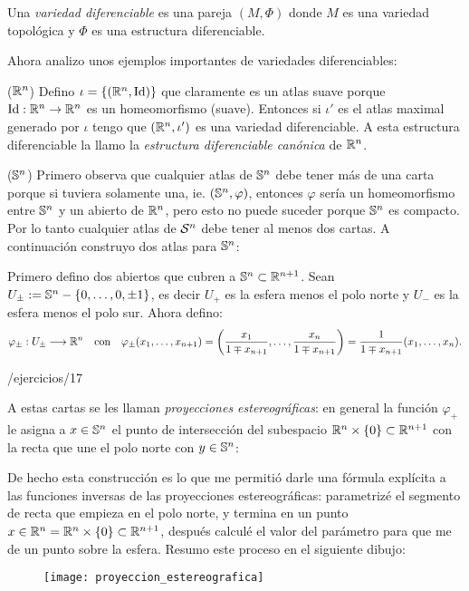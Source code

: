 \documentclass[../../topologia_algebraica]{subfiles}
\begin{document}
\begin{defin}
  Una \emph{variedad diferenciable} es una pareja $(M,\Phi)$ donde $M$ es una variedad topol\'ogica
  y $\Phi$ es una estructura diferenciable.
\end{defin}

Ahora analizo unos ejemplos importantes de variedades diferenciables:
\begin{ejemplo}\label{ejemplo:estructura_diferenciable_canonica_Rn}
  ($\mathbb{R}^n$) Defino $\iota=\{(\mathbb{R}^n,\text{Id})\}$ que claramente es un atlas suave porque $\text{Id}:\mathbb{R}^n\rightarrow\mathbb{R}^n$
  es un homeomorfismo (suave). Entonces si $\iota'$ es el atlas maximal generado por $\iota$ tengo que
  $(\mathbb{R}^n,\iota')$ es una variedad diferenciable. A esta estructura diferenciable la llamo la
  \emph{estructura diferenciable can\'onica} de $\mathbb{R}^n$.
\end{ejemplo}

\begin{ejemplo}
  ($\mathbb{S}^n$) Primero observa que cualquier atlas de $\mathbb{S}^n$ debe tener m\'as de una carta porque si
  tuviera solamente una, ie. $(\mathbb{S}^n,\varphi)$, entonces $\varphi$ ser\'ia un homeomorfismo entre
  $\mathbb{S}^n$ y un abierto de $\mathbb{R}^n$, pero esto no puede suceder porque $\mathbb{S}^n$ es compacto. Por lo
  tanto cualquier atlas de $\mathcal{S}^n$ debe tener al menos dos cartas. A continuaci\'on construyo dos
  atlas para $\mathbb{S}^n$:

  Primero defino dos abiertos que cubren a $\mathbb{S}^n\subset\mathbb{R}^{n+1}$. Sean
  $U_{\pm}:=\mathbb{S}^n-\{0,\ldots,0,\pm 1\}$, es decir $U_+$ es la esfera menos el polo norte y $U_-$ es la
  esfera menos el polo sur. Ahora defino:
  \[
    \varphi_{\pm}:U_{\pm}\longrightarrow \mathbb{R}^n \quad\text{con}\quad
    \varphi_{\pm}(x_1,\ldots,x_{n+1})=\left( \frac{x_1}{1\mp x_{n+1}},\ldots,\frac{x_n}{1\mp x_{n+1}} \right)=
    \frac{1}{1\mp x_{n+1}}(x_1,\ldots,x_n).
  \]

  {/ejercicios/17}%
  
  A  estas cartas se les llaman \emph{proyecciones estereogr\'aficas}: en general la funci\'on
  $\varphi_+$ le asigna a $x\in\mathbb{S}^n$ el punto de intersecci\'on del subespacio
  $\mathbb{R}^n\times\{0\}\subset\mathbb{R}^{n+1}$ con la recta que une el polo norte con $y\in\mathbb{S}^n$:

  De hecho esta construcci\'on es lo que me permiti\'o darle una f\'ormula expl\'icita a las
  funciones inversas de las proyecciones estereogr\'aficas: parametriz\'e el segmento de recta que
  empieza en el polo norte, y termina en un punto $x\in\mathbb{R}^n=\mathbb{R}^n\times\{0\}\subset\mathbb{R}^{n+1}$,
  despu\'es calcul\'e el valor del par\'ametro para que me de un punto sobre la esfera. Resumo
  este proceso en el siguiente dibujo:
  \begin{figure}[ht]%
    \centering
    \texttt{[image: proyeccion\_estereografica]}
  \end{figure}%
\end{ejemplo}
\end{document}
